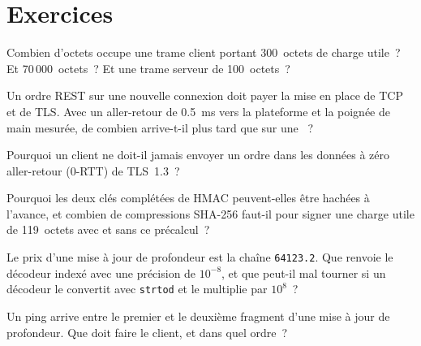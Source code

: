 \section{Exercices}

\begin{exercise}[$\star$]\label{exo:ll:websocket-rest-tls-and-json-at-speed:1}
Combien d'octets occupe une trame client portant 300~octets de charge utile~? Et 70\,000~octets~? Et une trame serveur de 100~octets~?
\end{exercise}

\begin{exercise}[$\star$]\label{exo:ll:websocket-rest-tls-and-json-at-speed:2}
Un ordre REST sur une nouvelle connexion doit payer la mise en place de TCP et de TLS. Avec un aller-retour de \qty{0.5}{\milli\second} vers la plateforme et la
poignée de main mesurée, de combien arrive-t-il plus tard que sur une ~?
\end{exercise}

\begin{exercise}[$\star$]\label{exo:ll:websocket-rest-tls-and-json-at-speed:3}
Pourquoi un client ne doit-il jamais envoyer un ordre dans les données à zéro aller-retour (0-RTT) de TLS~1.3~?
\end{exercise}

\begin{exercise}[$\star\star$]\label{exo:ll:websocket-rest-tls-and-json-at-speed:4}
Pourquoi les deux clés complétées de HMAC peuvent-elles être hachées à l'avance, et combien de compressions SHA-256 faut-il pour signer une charge utile de 119~octets
avec et sans ce précalcul~?
\end{exercise}

\begin{exercise}[$\star\star$]\label{exo:ll:websocket-rest-tls-and-json-at-speed:5}
Le prix d'une mise à jour de profondeur est la chaîne \texttt{64123.2}. Que renvoie le décodeur indexé avec une précision de $10^{-8}$, et que peut-il mal tourner si un
décodeur le convertit avec \texttt{strtod} et le multiplie par $10^8$~?
\end{exercise}

\begin{exercise}[$\star\star$]\label{exo:ll:websocket-rest-tls-and-json-at-speed:6}
Un ping arrive entre le premier et le deuxième fragment d'une mise à jour de profondeur. Que doit faire le client, et dans quel ordre~?
\end{exercise}

